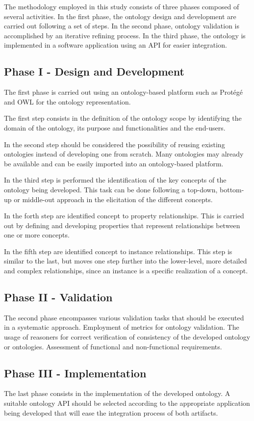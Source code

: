 The methodology employed in this study consists of three phases composed of several activities.
In the first phase, the ontology design and development are carried out following a set of steps.
In the second phase, ontology validation is accomplished by an iterative refining process.
In the third phase, the ontology is implemented in a software application using an API for easier integration.

\subsection{Phase I - Design and Development} \label{phasesChapter}

The first phase is carried out using an ontology-based platform such as Protégé and OWL for the ontology representation.

The first step consists in the definition of the ontology scope by identifying the domain of the ontology, its purpose and functionalities and the end-users.

In the second step should be considered the possibility of reusing existing ontologies instead of developing one from scratch.
Many ontologies may already be available and can be easily imported into an ontology-based platform.

In the third step is performed the identification of the key concepts of the ontology being developed.
This task can be done following a top-down, bottom-up or middle-out approach in the elicitation of the different concepts.

In the forth step are identified concept to property relationships.
This is carried out by defining and developing properties that represent relationships between one or more concepts.

In the fifth step are identified concept to instance relationships.
This step is similar to the last, but moves one step further into the lower-level, more detailed and complex relationships, since an instance is a specific realization of a concept.

\subsection{Phase II - Validation}
 
The second phase encompasses various validation tasks that should be executed in a systematic approach.
Employment of metrics for ontology validation.
The usage of reasoners for correct verification of consistency of the developed ontology or ontologies.
Assessment of functional and non-functional requirements.

\subsection{Phase III - Implementation}

The last phase consists in the implementation of the developed ontology.
A suitable ontology API should be selected according to the appropriate application being developed that will ease the integration process of both artifacts.



